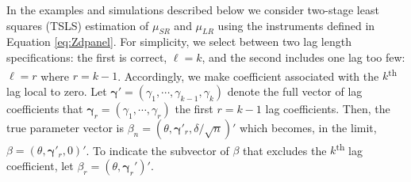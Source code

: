 In the examples and simulations described below we consider two-stage least squares (TSLS) estimation of $\mu_{SR}$ and $\mu_{LR}$ using the instruments defined in Equation \ref{eq:Zdpanel}. 
For simplicity, we select between two lag length specifications: the first is correct, $\ell = k$, and the second includes one lag too few: $\ell = r$ where $r = k-1$.
Accordingly, we make coefficient associated with the $k$\textsuperscript{th} lag local to zero.
Let $\boldsymbol{\gamma}' = (\gamma_1, \cdots, \gamma_{k-1}, \gamma_{k})$ denote the full vector of lag coefficients that $\boldsymbol{\gamma}_{r} = (\gamma_1, \cdots, \gamma_{r})$ the first $r = k-1$ lag coefficients.
Then, the true parameter vector is $\beta_n = (\theta, \boldsymbol{\gamma}'_{r}, \delta/\sqrt{n})'$ which becomes, in the limit, $\beta = (\theta, \boldsymbol{\gamma}'_r, 0)'$.
To indicate the subvector of $\beta$ that excludes the $k$\textsuperscript{th} lag coefficient, let $\beta_{r} = (\theta, \boldsymbol{\gamma}_r')'$.

